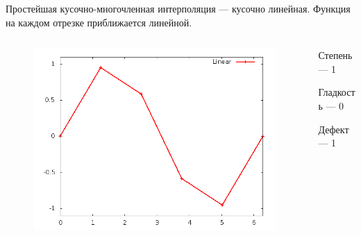 \documentclass[professionalfonts,compress,unicode]{beamer}
\begin{document}
{
	Простейшая кусочно-многочленная интерполяция --- кусочно линейная. 
	Функция на каждом отрезке приближается линейной.
	
	\begin{columns}[c]
	\begin{column}{0.6\textwidth}
	\begin{figure}
	\center
	\includegraphics[width=\textwidth]{spline1_1.png}%
	\end{figure}
	\end{column}
	\begin{column}{0.4\textwidth}
	Степень --- 1
	
	Гладкость --- 0 
	
	Дефект --- 1
	\end{column}
	\end{columns}
}
\end{document}
